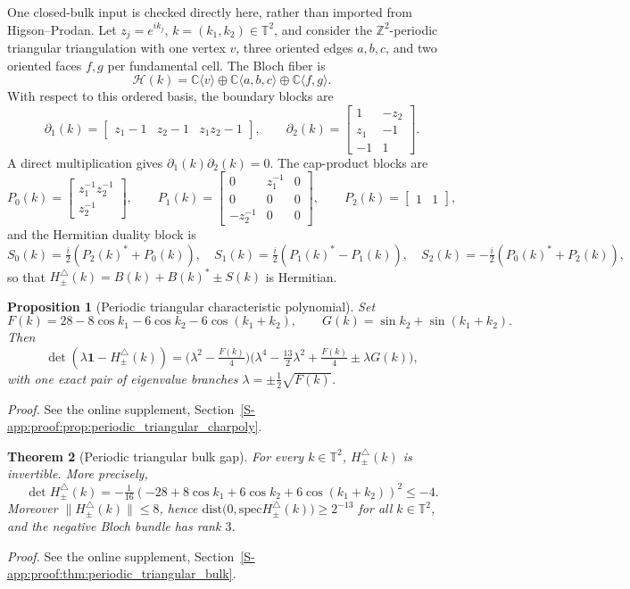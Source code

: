 \documentclass[11pt]{article}
\numberwithin{equation}{section}
\newtheorem{theorem}{Theorem}[section]
\newtheorem{proposition}[theorem]{Proposition}
\theoremstyle{definition}
\theoremstyle{remark}
\newcommand{\proofsuppref}[1]{%
  \par\noindent\emph{Proof.} See the online supplement, Section~\ref{S-#1}.\par\medskip
}
\newcommand{\Id}{\mathbf{1}}
\newcommand{\spec}{\mathrm{spec}}
\newcommand{\dist}{\mathrm{dist}}
\begin{document}
One closed-bulk input is checked directly here, rather than imported from Higson--Prodan. Let
\(z_j=e^{ik_j}\), \(k=(k_1,k_2)\in\mathbb T^2\), and consider the
\(\mathbb Z^2\)-periodic triangular triangulation with one vertex \(v\), three oriented edges
\(a,b,c\), and two oriented faces \(f,g\) per fundamental cell. The Bloch fiber is
\[
\mathcal H(k)
=
\mathbb C\langle v\rangle\oplus
\mathbb C\langle a,b,c\rangle\oplus
\mathbb C\langle f,g\rangle .
\]
With respect to this ordered basis, the boundary blocks are
\[
\partial_1(k)=
\begin{bmatrix}
z_1-1&z_2-1&z_1z_2-1
\end{bmatrix},
\qquad
\partial_2(k)=
\begin{bmatrix}
1&-z_2\\
z_1&-1\\
-1&1
\end{bmatrix}.
\]
A direct multiplication gives \(\partial_1(k)\partial_2(k)=0\). The cap-product blocks are
\[
P_0(k)=
\begin{bmatrix}
z_1^{-1}z_2^{-1}\\
z_2^{-1}
\end{bmatrix},
\qquad
P_1(k)=
\begin{bmatrix}
0&z_1^{-1}&0\\
0&0&0\\
-z_2^{-1}&0&0
\end{bmatrix},
\qquad
P_2(k)=
\begin{bmatrix}
1&1
\end{bmatrix},
\]
and the Hermitian duality block is
\[
S_0(k)=\tfrac{i}{2}(P_2(k)^*+P_0(k)),\quad
S_1(k)=\tfrac{i}{2}(P_1(k)^*-P_1(k)),\quad
S_2(k)=-\tfrac{i}{2}(P_0(k)^*+P_2(k)),
\]
so that \(H_\pm^\triangle(k)=B(k)+B(k)^*\pm S(k)\) is Hermitian.

\begin{proposition}[Periodic triangular characteristic polynomial]\label{prop:periodic_triangular_charpoly}
Set
\[
F(k)=28-8\cos k_1-6\cos k_2-6\cos(k_1+k_2),
\qquad
G(k)=\sin k_2+\sin(k_1+k_2).
\]
Then
\[
\det\!\left(\lambda\Id-H_\pm^\triangle(k)\right)
=
\bigl(\lambda^2-\tfrac{F(k)}4\bigr)
\bigl(\lambda^4-\tfrac{13}{2}\lambda^2+\tfrac{F(k)}4
\pm \lambda G(k)\bigr),
\]
with one exact pair of eigenvalue branches \(\lambda=\pm \tfrac12\sqrt{F(k)}\).
\end{proposition}
\proofsuppref{app:proof:prop:periodic_triangular_charpoly}

\begin{theorem}[Periodic triangular bulk gap]\label{thm:periodic_triangular_bulk}
For every \(k\in\mathbb T^2\), \(H_\pm^\triangle(k)\) is invertible. More precisely,
\[
\det H_\pm^\triangle(k)
=
-\tfrac1{16}
\left(
-28+8\cos k_1+6\cos k_2+6\cos(k_1+k_2)
\right)^2
\le -4.
\]
Moreover \(\|H_\pm^\triangle(k)\|\le8\), hence
\(\dist\bigl(0,\spec H_\pm^\triangle(k)\bigr)\ge 2^{-13}\) for all \(k\in\mathbb T^2\), and the
negative Bloch bundle has rank \(3\).
\end{theorem}
\proofsuppref{app:proof:thm:periodic_triangular_bulk}
\end{document}
